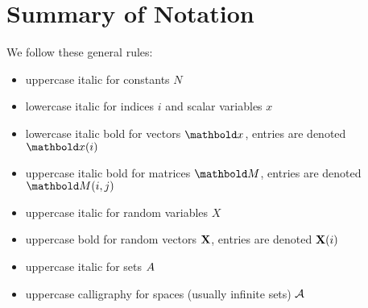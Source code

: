 \setlength\LTleft{0pt}
\setlength\LTright{0pt}

\chapter{Summary of Notation}

We follow these general rules: \begin{itemize}
  \item uppercase italic for constants $N$
  \item lowercase italic for indices $i$ and scalar variables $x$
  \item lowercase italic bold for vectors $\vx$, entries are denoted $\vx(i)$
  \item uppercase italic bold for matrices $\mM$, entries are denoted $\mM(i,j)$
  \item uppercase italic for random variables $X$
  \item uppercase bold for random vectors $\mathbf{X}$, entries are denoted $\mathbf{X}(i)$
  \item uppercase italic for sets $A$
  \item uppercase calligraphy for spaces (usually infinite sets) $\mathcal{A}$
\end{itemize}

\vspace{16ex}

